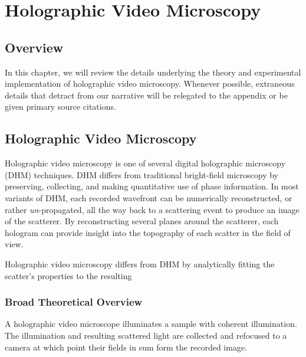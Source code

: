\chapter{Holographic Video Microscopy}
\label{ch:hvm}


\newcommand{\einc}{\vec{E}_{\text{inc}}}
\newcommand{\escat}{\vec{E}_{\text{s}}}
\newcommand{\eadd}{\vec{E}_{\text{add}}}


\section{Overview}

In this chapter, we will review the details 
underlying the theory and experimental implementation
of holographic video microscopy. Whenever possible,
extraneous details that detract from our narrative
will be relegated to the appendix or be given 
primary source citations.


\section{Holographic Video Microscopy}
\label{ch:hvm:sec:hvm}



Holographic video microscopy is one of several
digital holographic microscopy (DHM) techniques.
DHM differs from traditional bright-field microscopy
by preserving, collecting, and making quantitative use of phase
information. In most variants of DHM, each recorded
wavefront can be numerically reconstructed, or rather
{\it un}-propagated, all the way back to a scattering event
to produce an image of the scatterer. By reconstructing
several planes around the scatterer, each hologram
can provide insight into the topography of each scatter
in the field of view.

Holographic video microscopy differs from DHM by analytically
fitting the scatter's properties to the resulting


\subsection{Broad Theoretical Overview}
\label{ch:hvm:sec:hvm:ssec:overview}

A holographic video microscope illuminates a sample
with coherent illumination. The illumination and resulting
scattered light are collected and refocused to a camera at
which point their fields in sum form the recorded image.


